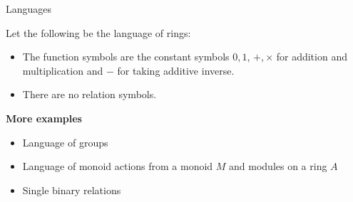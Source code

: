 \documentclass[10pt]{beamer}
\newcommand{\<}{\langle}
\renewcommand{\>}{\rangle}
\newcommand{\link}[1]{\hypertarget{#1}{}}
\begin{document}
\begin{frame}[fragile]{Languages}
\vspace{1 em}

\pause

  \begin{definition}
    \link{dfn_rings}
        Let the following be the language of rings:
    \begin{itemize}
        \item The function symbols are the constant symbols $0, 1$,
        $+ , \times$ for addition and multiplication
        and $-$ for taking additive inverse.
        \item There are no relation symbols.
    \end{itemize}
  \end{definition}

\pause

\textbf{More examples}

\begin{itemize}
  \item Language of groups
  \item Language of monoid actions from a monoid $M$
        and modules on a ring $A$
  \item Single binary relations
\end{itemize}

\end{frame}
\end{document}
